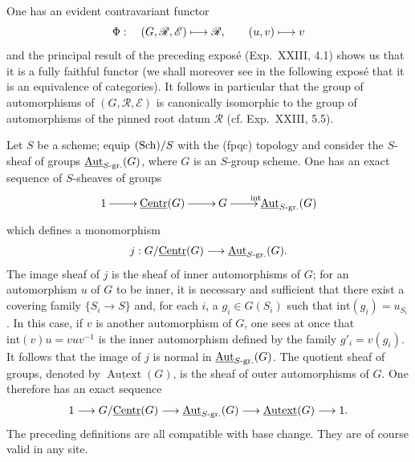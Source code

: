 One has an evident contravariant functor
\[
\Phi:\quad (G,\mathscr R,\mathscr E)\longmapsto\mathscr R,\qquad (u,v)\longmapsto v
\]
and the principal result of the preceding exposé (Exp.~XXIII, 4.1) shows us that it is a fully faithful functor (we shall moreover see in the following exposé that it is an equivalence of categories). It follows in particular that the group of automorphisms of $(G,\mathscr R,\mathscr E)$ is canonically isomorphic to the group of automorphisms of the pinned root datum $\mathscr R$ (cf. Exp.~XXIII, 5.5).

\label{XXIV.1.1}
Let $S$ be a scheme; equip $\textup{(Sch)}/S$ with the (fpqc) topology and consider the $S$-sheaf of groups $\underline{\operatorname{Aut}}_{S\text{-gr.}}(G)$, where $G$ is an $S$-group scheme. One has an exact sequence of $S$-sheaves of groups
\[
\xymatrix{1\ar[r]&\uCentr(G)\ar[r]&G\ar[r]^{\mathrm{int}}&\underline{\Aut}_{S\text{-gr.}}(G)}
\]
which defines a monomorphism
\[
j:G/\underline{\mathrm{Centr}}(G)\longrightarrow\underline{\operatorname{Aut}}_{S\text{-gr.}}(G).
\]
The image sheaf of $j$ is the sheaf of inner automorphisms of $G$; for an automorphism $u$ of $G$ to be inner, it is necessary and sufficient that there exist a covering family $\{S_i\to S\}$ and, for each $i$, a $g_i\in G(S_i)$ such that $\mathrm{int}(g_i)=u_{S_i}$. In this case, if $v$ is another automorphism of $G$, one sees at once that $\mathrm{int}(v)u=vuv^{-1}$ is the inner automorphism defined by the family $g'_i=v(g_i)$. It follows that the image of $j$ is normal in $\underline{\operatorname{Aut}}_{S\text{-gr.}}(G)$. The quotient sheaf of groups, denoted by $\underline{\operatorname{Autext}}(G)$, is the sheaf of outer automorphisms of $G$. One therefore has an exact sequence
\[
1\longrightarrow G/\underline{\mathrm{Centr}}(G)\longrightarrow\underline{\operatorname{Aut}}_{S\text{-gr.}}(G)
\longrightarrow\underline{\operatorname{Autext}}(G)\longrightarrow1.
\]
The preceding definitions are all compatible with base change. They are of course valid in any site.

